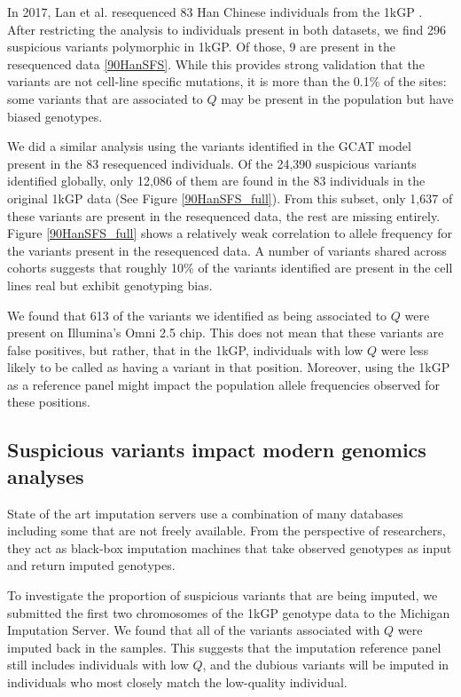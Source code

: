 \documentclass[custompaper]{MBE}%
\begin{document}
In 2017, Lan et al. resequenced 83 Han Chinese individuals from the 1kGP \citep{Lan2017}.
After restricting the analysis to individuals present in both datasets, we find 296 suspicious variants polymorphic in 1kGP. Of those, 9 are present in the resequenced data \ref{90HanSFS}.
While this provides strong validation that the variants are not cell-line specific mutations, it is more than the 0.1\% of the sites: some variants that are associated to $Q$ may be present in the population but have biased genotypes.

We did a similar analysis using the variants identified in the GCAT model present in the 83 resequenced individuals.
Of the 24,390 suspicious variants identified globally, only 12,086 of them are found in the 83 individuals in the original 1kGP data (See Figure \ref{90HanSFS_full}).
From this subset, only 1,637 of these variants are present in the resequenced data, the rest are missing entirely.
Figure \ref{90HanSFS_full} shows a relatively weak correlation to allele frequency for the variants present in the resequenced data.
A number of variants shared across cohorts suggests that roughly 10\% of the variants identified are present in the cell lines real but exhibit genotyping bias.


We found that 613 of the variants we identified as being associated to $Q$ were present on Illumina's Omni 2.5 chip. 
This does not mean that these variants are false positives, but rather, that in the 1kGP, individuals with low $Q$ were less likely to be called as having a variant in that position. 
Moreover, using the 1kGP as a reference panel might impact the population allele frequencies observed for these positions.

\subsection{Suspicious variants impact modern genomics analyses}

State of the art imputation servers use a combination of many databases including some that are not freely available.
From the perspective of researchers, they act as black-box imputation machines that take observed genotypes as input and return imputed genotypes.  

To investigate the proportion of suspicious variants that are being imputed, we submitted the first two chromosomes of  the 1kGP genotype data to the Michigan Imputation Server.
We found that all of the variants associated with $Q$ were imputed back in the samples.
This suggests that the imputation reference panel still includes individuals with low $Q$, and the dubious variants will be imputed in individuals who most closely match the low-quality individual.
\end{document}
